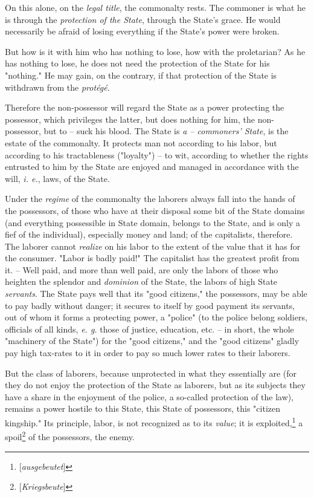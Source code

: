 On this alone, on the \textit{legal title}, the commonalty rests. The commoner 
is what he is through the \textit{protection of the State}, through the 
State's grace. He would necessarily be afraid of losing everything if the 
State's power were broken.

But how is it with him who has nothing to lose, how with the proletarian? As 
he has nothing to lose, he does not need the protection of the State for his 
"{}nothing."{} He may gain, on the contrary, if that protection of the State 
is withdrawn from the \textit{prot\'eg\'e}.

Therefore the non-possessor will regard the State as a power protecting the 
possessor, which privileges the latter, but does nothing for him, the 
non-possessor, but to -- suck his blood. The State is \textit{a -- commoners' 
State}, is the estate of the commonalty. It protects man not according to his 
labor, but according to his tractableness ("{}loyalty"{}) -- to wit, according 
to whether the rights entrusted to him by the State are enjoyed and managed in 
accordance with the will, \textit{i. e.}, laws, of the State.

Under the \textit{regime} of the commonalty the laborers always fall into the 
hands of the possessors, of those who have at their disposal some bit of the 
State domains (and everything possessible in State domain, belongs to the 
State, and is only a fief of the individual), especially money and land; of 
the capitalists, therefore. The laborer cannot \textit{realize} on his labor 
to the extent of the value that it has for the consumer. "{}Labor is badly 
paid!"{} The capitalist has the greatest profit from it. -- Well paid, and 
more than well paid, are only the labors of those who heighten the splendor 
and \textit{dominion} of the State, the labors of high State 
\textit{servants}. The State pays well that its "{}good citizens,"{} the 
possessors, may be able to pay badly without danger; it secures to itself by 
good payment its servants, out of whom it forms a protecting power, a 
"{}police"{} (to the police belong soldiers, officials of all kinds, 
\textit{e. g.} those of justice, education, etc. -- in short, the whole 
"{}machinery of the State"{}) for the "{}good citizens,"{} and the "{}good 
citizens"{} gladly pay high tax-rates to it in order to pay so much lower 
rates to their laborers.

But the class of laborers, because unprotected in what they essentially are 
(for they do not enjoy the protection of the State as laborers, but as its 
subjects they have a share in the enjoyment of the police, a so-called 
protection of the law), remains a power hostile to this State, this State of 
possessors, this "{}citizen kingship."{} Its principle, labor, is not 
recognized as to its \textit{value}; it is 
exploited,\footnote{[\textit{ausgebeutet}]} a 
spoil\footnote{[\textit{Kriegsbeute}]} of the possessors, the enemy.

